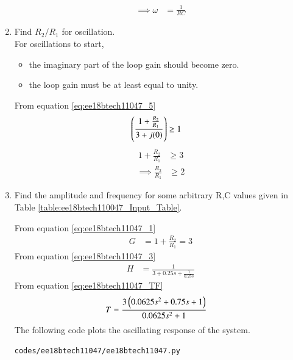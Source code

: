 \begin{enumerate}[label=\arabic*.,ref=\theenumi]
\begin{align}
\label{eq:ee18btech11047_freq}
\implies \omega &= \frac{1}{RC}
\end{align}
%
\item Find $R_{2}/R_{1}$ for oscillation.\\
\solution For oscillations to start, 
\begin{itemize}
    \item the imaginary part of the loop gain should become zero.
    \item the loop gain must be at least equal to unity.
\end{itemize}
From equation \eqref{eq:ee18btech11047_5} 
\begin{align}
\left(\frac{1+\frac{R_{2}}{R_{1}}}{3+j(0)}\right) &\geq 1
\end{align}
\begin{align}
1+\frac{R_{2}}{R_{1}} &\geq 3
\end{align}
\begin{align}
\implies \frac{R_{2}}{R_{1}} &\geq 2
\end{align}
\item Find the amplitude and frequency for some arbitrary R,C values given in Table \ref{table:ee18btech110047_Input_Table}.\\
\begin{table}[!ht]
\centering

\caption{}
\label{table:ee18btech110047_Input_Table}
\end{table}
\solution From equation \eqref{eq:ee18btech11047_1} 
\begin{align}
G &= 1 + \frac{R_{2}}{R_{1}} = 3
\end{align}
From equation \eqref{eq:ee18btech11047_3}
\begin{align}
H &= \frac{1}{3 + 0.25s + \frac{1}{0.25s}}
\end{align}
From equation \eqref{eq:ee18btech11047_TF}
\begin{align}
T &= \frac{3\left(0.0625s^{2} + 0.75s + 1\right)}{0.0625s^{2} + 1}
\end{align}
The following code plots the oscillating response of the system.
\begin{lstlisting}
codes/ee18btech11047/ee18btech11047.py
\end{lstlisting}
\begin{figure}[!ht]
\centering

\end{figure}
\end{enumerate}

